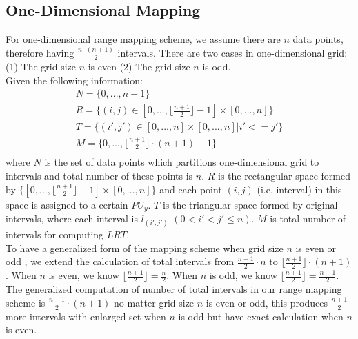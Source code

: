 \documentclass[AMA,LATO1COL]{WileyNJD-v2}
\begin{document}
\subsection{One-Dimensional Mapping}
For one-dimensional range mapping scheme, we assume there are $n$ data points, therefore having ${\frac{n \cdot (n+1)}{2}}$ intervals. There are two cases in one-dimensional grid: (1) The grid size $n$ is even (2) The grid size $n$ is odd. \\

Given the following information:
\begin{eqnarray}
& N = \{0,...,n-1\}               & \\
& R = \{(i,j)\in [0,...,\lfloor \frac{n+1}{2}\rfloor -1] \times [0,...,n]\}     &\\
& T = \{(i',j') \in [0,...,n] \times [0,...,n] | i'<=j'\}   &\\
& M = \{0,..., \lfloor \frac{n+1}{2}\rfloor \cdot (n+1)-1\}  &\\
\end{eqnarray}
where  $ N$ is the set of data points which partitions one-dimensional grid to intervals and total number of these points is $n$. $ R$ is the rectangular space formed by $\{[0,...,\lfloor \frac{n+1}{2}\rfloor -1]\times [0,...,n]\}$ and each point $(i,j)$ (i.e. interval) in this space is assigned to a certain $PU_y$. $T$ is the triangular space formed by original intervals, where each interval is $l_(i',j')$ $(0<i'<j'\leq n)$. $ M$ is total number of  intervals for computing $LRT$.\\
 To have a generalized form of the mapping scheme when grid size $n$ is even or odd , we extend the calculation of total intervals from $\frac{n+1}{2} \cdot n$ to $\lfloor \frac{n+1}{2}\rfloor \cdot (n+1)$. When $n$ is even, we know $\lfloor \frac{n+1}{2}\rfloor =\frac{n}{2}$. When $n$ is odd, we know $\lfloor \frac{n+1}{2}\rfloor= \frac{n+1}{2}$. The generalized computation of number of total intervals in our range mapping scheme is $\frac{n+1}{2} \cdot (n+1) $ no matter grid size $n$ is even or odd, this produces $\frac{n+1}{2}$ more intervals with enlarged set when $n$ is odd but have exact calculation when $n$ is even. \\
\end{document}
